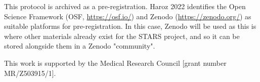 \vspace{0.5cm}

This protocol is archived as a pre-registration. Haroz 2022 identifies the Open Science Framework (OSF, \url{https://osf.io/}) and Zenodo (\url{https://zenodo.org/}) as suitable platforms for pre-registration.\autocite{haroz_comparison_2022} In this case, Zenodo will be used as this is where other materials already exist for the STARS project, and so it can be stored alongside them in a Zenodo "community".

This work is supported by the Medical Research Council [grant number MR/Z503915/1].

\newpage
\tableofcontents